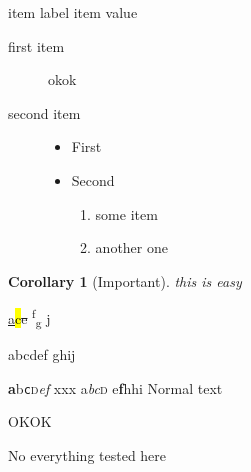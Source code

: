 \documentclass{book}
\begin{document}
\begin{list}{}{}
\item[item label] item value
\begin{description}
\item[first item] okok
\item[second item]
\begin{itemize}
\item First
\item Second
\begin{enumerate}
\item some item
\item another one
\end{enumerate}
\end{itemize}
\end{description}
\end{list}

\newtheorem{xCor}{Corollary}
\begin{xCor}[Important] this is easy \end{xCor}

\ul{a}\hl{c}\st{e}
\textsuperscript{f}\textsubscript{g}
\underline{j}

{\Huge a}{\huge b}{\LARGE c}{\Large d}{\large e}{\normalsize f}{\small
  g}{\footnotesize h}{\scriptsize i}{\tiny j}

\textbf{a}\textsf{b}\texttt{c}\textsc{d}\textsl{e}\textit{f}
\textup{x}\textmd{x}\textrm{x} %
{\upshape a}{\itshape b}{\slshape c}{\scshape d}
{\mdseries e}{\bfseries f}{\ttfamily h}{\sffamily h}{\rmfamily i}
Normal text

\par

\def\cite@prenote{cf}
\def\cite@@type{fx}
\cite[p 30]{toto}

OKOK 

No everything tested here
\def\X{} \def\Y{}
\begin{participant} \X\Y \end{participant}
\end{document}
